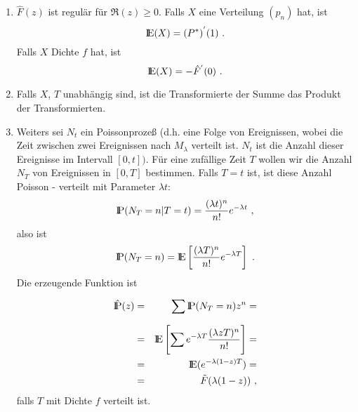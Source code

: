 \begin{appendix}
\begin{enumerate}
\item $ \hat F(z)$ ist regulär für $ \Re (z) \geq 0$. Falls $X$ eine
Verteilung $(p_{n})$ hat, ist
\begin{displaymath}
{\rm I\kern-0.2em E}(X) = (P^{*})^{'}(1) ~.
\end{displaymath}
Falls $X$ Dichte $f$ hat, ist
\begin{displaymath}
{\rm I\kern-0.2em E}(X) = -\hat F^{'}(0) ~.
\end{displaymath}
\item Falls $X$, $T$ unabhängig sind, ist die Transformierte der Summe
das Produkt der Transformierten.
\item Weiters sei $N_{t}$ ein Poissonprozeß (d.h. eine Folge von
Ereignissen, wobei die Zeit zwischen zwei Ereignissen nach $M_{\lambda}$
verteilt ist. $N_{t}$ ist die Anzahl dieser Ereignisse im Intervall
$[0,t])$. Für eine zufällige Zeit $T$ wollen wir die Anzahl $N_{T}$ von
Ereignissen in $[0,T]$ bestimmen. Falls $T=t$ ist, ist diese Anzahl
Poisson - verteilt mit Parameter $\lambda t$:
\begin{displaymath}
{\rm I\kern-0.2em P} (N_{T} = n | T = t) = \frac{(\lambda t)^{n}}{n!} e^{- \lambda t} ~,
\end{displaymath}
also ist
\begin{displaymath}
{\rm I\kern-0.2em P} (N_{T} = n) = {\rm I\kern-0.2em E} \left[ \frac{( \lambda
T)^n}{n!} e^{- \lambda T} \right] ~.
\end{displaymath}
Die erzeugende Funktion ist
\begin{eqnarray*}
\hat {{\rm I\kern-0.2em P}}(z) &=&  \sum_{}^{} {\rm I\kern-0.2em P}(N_{T} = n) z^{n} = \\
&=& {\rm I\kern-0.2em E} \left[ \sum_{}^{} e^{-\lambda T} \frac{(\lambda z T)^{n}}{n!}
\right] = \\
&=& {\rm I\kern-0.2em E} (e^{- \lambda (1-z)T}) = \\
&=& \tilde F (\lambda(1-z)) ~,
\end{eqnarray*}
falls $T$ mit Dichte $f$ verteilt ist.
\end{enumerate}
\end{appendix}

